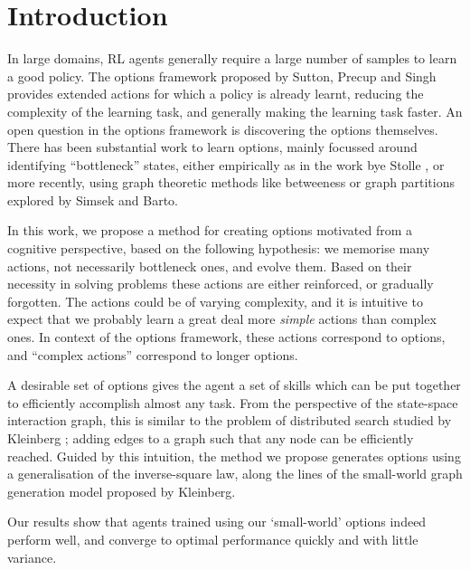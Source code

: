 \section{Introduction}
\label{sec:intro}

In large domains, RL agents generally require a large number of samples to learn
a good policy. The options framework proposed by Sutton, Precup and Singh
\cite{SuttonPrecupSingh1998} provides extended actions for which a policy is
already learnt, reducing the complexity of the learning task, and generally
making the learning task faster.  An open question in the options framework is
discovering the options themselves.  There has been substantial work to learn
options, mainly focussed around identifying ``bottleneck'' states, either
empirically as in the work bye Stolle \cite{Stolle}, or more recently, using
graph theoretic methods like betweeness \cite{Simsek} or graph partitions
\cite{Simsek2005} explored by Simsek and Barto.

In this work, we propose a method for creating options motivated from a
cognitive perspective, based on the following hypothesis: we memorise many
actions, not necessarily bottleneck ones, and evolve them. Based on their
necessity in solving problems these actions are either reinforced, or gradually
forgotten. The actions could be of varying complexity, and it is intuitive to
expect that we probably learn a great deal more {\em simple} actions than
complex ones. In context of the options framework, these actions correspond to
options, and ``complex actions'' correspond to longer options.

A desirable set of options gives the agent a set of skills which can be put
together to efficiently accomplish almost any task. From the perspective of the
state-space interaction graph, this is similar to the problem of distributed
search studied by Kleinberg \cite{Kleinberg}; adding edges to a graph such that
any node can be efficiently reached. Guided by this intuition, the method we
propose generates options using a generalisation of the inverse-square law,
along the lines of the small-world graph generation model proposed by Kleinberg.

Our results show that agents trained using our `small-world' options indeed
perform well, and converge to optimal performance quickly and with little
variance. 


